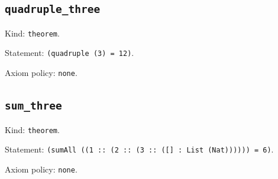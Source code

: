 \documentclass[11pt]{article}
\begin{document}
\subsection*{\texttt{quadruple\_three}}
\noindent Kind: \texttt{theorem}.\par
\noindent Statement: \texttt{(quadruple (3) = 12)}.\par
\noindent Axiom policy: \texttt{none}.\par
\subsection*{\texttt{sum\_three}}
\noindent Kind: \texttt{theorem}.\par
\noindent Statement: \texttt{(sumAll ((1 :: (2 :: (3 :: ([] : List (Nat)))))) = 6)}.\par
\noindent Axiom policy: \texttt{none}.\par
\end{document}
